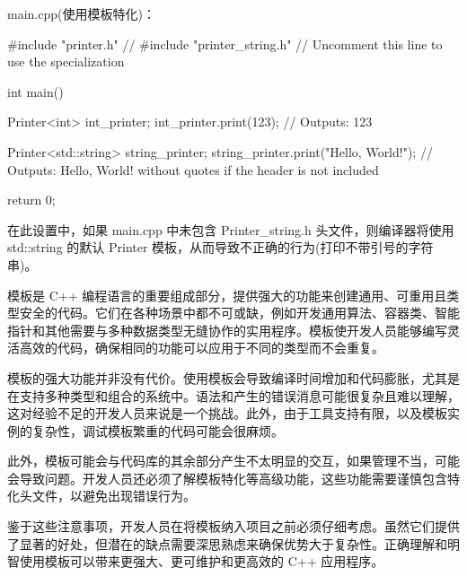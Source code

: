 main.cpp(使用模板特化)：

\begin{cpp}
#include "printer.h"
// #include "printer_string.h" // Uncomment this line to use the specialization

int main() {
    Printer<int> int_printer;
    int_printer.print(123); // Outputs: 123

    Printer<std::string> string_printer;
    string_printer.print("Hello, World!"); // Outputs: Hello, World! without quotes if the header is not included

    return 0;
}
\end{cpp}

在此设置中，如果 main.cpp 中未包含 Printer\_string.h 头文件，则编译器将使用 std::string 的默认 Printer 模板，从而导致不正确的行为(打印不带引号的字符串)。

模板是 C++ 编程语言的重要组成部分，提供强大的功能来创建通用、可重用且类型安全的代码。它们在各种场景中都不可或缺，例如开发通用算法、容器类、智能指针和其他需要与多种数据类型无缝协作的实用程序。模板使开发人员能够编写灵活高效的代码，确保相同的功能可以应用于不同的类型而不会重复。

模板的强大功能并非没有代价。使用模板会导致编译时间增加和代码膨胀，尤其是在支持多种类型和组合的系统中。语法和产生的错误消息可能很复杂且难以理解，这对经验不足的开发人员来说是一个挑战。此外，由于工具支持有限，以及模板实例的复杂性，调试模板繁重的代码可能会很麻烦。

此外，模板可能会与代码库的其余部分产生不太明显的交互，如果管理不当，可能会导致问题。开发人员还必须了解模板特化等高级功能，这些功能需要谨慎包含特化头文件，以避免出现错误行为。

鉴于这些注意事项，开发人员在将模板纳入项目之前必须仔细考虑。虽然它们提供了显著的好处，但潜在的缺点需要深思熟虑来确保优势大于复杂性。正确理解和明智使用模板可以带来更强大、更可维护和更高效的 C++ 应用程序。
















